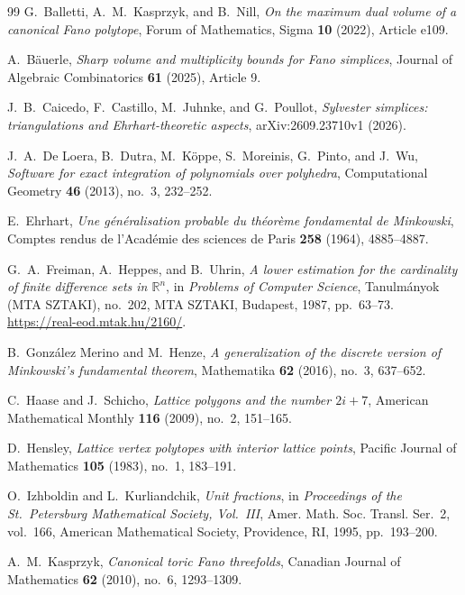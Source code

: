 \documentclass[reqno, 11pt]{article}
\numberwithin{equation}{section}
\theoremstyle{definition}
\begin{document}
\begin{thebibliography}{99}
 G.~Balletti, A.~M.~Kasprzyk, and B.~Nill, \emph{On the maximum dual volume of a canonical Fano polytope}, Forum of Mathematics, Sigma \textbf{10} (2022), Article e109.

 A.~B\"auerle, \emph{Sharp volume and multiplicity bounds for Fano simplices}, Journal of Algebraic Combinatorics \textbf{61} (2025), Article 9.

 J.~B.~Caicedo, F.~Castillo, M.~Juhnke, and G.~Poullot, \emph{Sylvester simplices: triangulations and Ehrhart-theoretic aspects}, arXiv:2609.23710v1 (2026).

 J.~A.~De Loera, B.~Dutra, M.~K\"oppe, S.~Moreinis, G.~Pinto, and J.~Wu, \emph{Software for exact integration of polynomials over polyhedra}, Computational Geometry \textbf{46} (2013), no.~3, 232--252.

 E.~Ehrhart, \emph{Une g\'en\'eralisation probable du th\'eor\`eme fondamental de Minkowski}, Comptes rendus de l'Académie des sciences de Paris \textbf{258} (1964), 4885--4887.

 G.~A.~Freiman, A.~Heppes, and B.~Uhrin, \emph{A lower estimation for the cardinality of finite difference sets in $\mathbb R^n$}, in \emph{Problems of Computer Science}, Tanulm\'anyok (MTA SZTAKI), no.~202, MTA SZTAKI, Budapest, 1987, pp.~63--73. \url{https://real-eod.mtak.hu/2160/}.

 B.~Gonz\'alez Merino and M.~Henze, \emph{A generalization of the discrete version of Minkowski's fundamental theorem}, Mathematika \textbf{62} (2016), no.~3, 637--652.

 C.~Haase and J.~Schicho, \emph{Lattice polygons and the number $2i+7$}, American Mathematical Monthly \textbf{116} (2009), no.~2, 151--165.

 D.~Hensley, \emph{Lattice vertex polytopes with interior lattice points}, Pacific Journal of Mathematics \textbf{105} (1983), no.~1, 183--191.

 O.~Izhboldin and L.~Kurliandchik, \emph{Unit fractions}, in \emph{Proceedings of the St.~Petersburg Mathematical Society, Vol.~III}, Amer. Math. Soc. Transl. Ser.~2, vol.~166, American Mathematical Society, Providence, RI, 1995, pp.~193--200. 

 A.~M.~Kasprzyk, \emph{Canonical toric Fano threefolds}, Canadian Journal of Mathematics \textbf{62} (2010), no.~6, 1293--1309.


\end{thebibliography}
\end{document}
